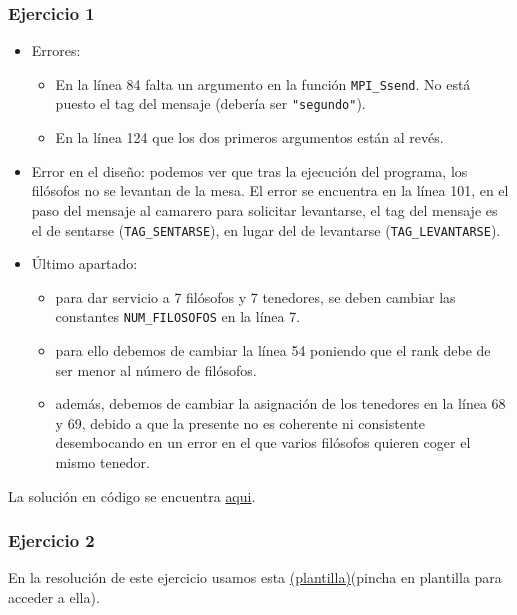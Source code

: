 \documentclass[a4paper,12pt]{article}
\begin{document}
\subsubsection*{Ejercicio 1}
\begin{itemize}
    \item Errores:
    \begin{itemize}
        \item En la línea 84 falta un argumento en la función \texttt{MPI\_Ssend}. No está puesto el tag del mensaje (debería ser \texttt{"segundo"}).
        \item En la línea 124 que los dos primeros argumentos están al revés.
    \end{itemize}
    \item Error en el diseño: podemos ver que tras la ejecución del programa, los filósofos no se levantan de la mesa. El error se encuentra en la línea 101, en el paso del mensaje al camarero para solicitar levantarse, el tag del mensaje es el de sentarse (\texttt{TAG\_SENTARSE}), en lugar del de levantarse (\texttt{TAG\_LEVANTARSE}).
    \item Último apartado: 
    \begin{itemize}
        \item para dar servicio a 7 filósofos y 7 tenedores, se deben cambiar las constantes \texttt{NUM\_FILOSOFOS} en la línea 7.
        \item para ello debemos de cambiar la línea 54 poniendo que el rank debe de ser menor al número de filósofos.
        \item además, debemos de cambiar la asignación de los tenedores en la línea 68 y 69, debido a que la presente no es coherente ni consistente desembocando en un error en el que varios filósofos quieren coger el mismo tenedor.
    \end{itemize}
\end{itemize}

La solución en código se encuentra \href{https://github.com/ElblogdeIsmael/ElblogdeIsmael.github.io/blob/main/Asignaturas/Tercer%20A%C3%B1o/SCD/Examenes/SegundoParcial/ETSIIT/code/ejercicio.cpp}{aqui}.

\subsubsection*{Ejercicio 2}

En la resolución de este ejercicio usamos esta \href{https://github.com/ElblogdeIsmael/ElblogdeIsmael.github.io/blob/main/Asignaturas/Tercer%20A%C3%B1o/SCD/Examenes/SegundoParcial/ETSIIT/code/prodcons2-muPlantilla.cpp}{(plantilla)}(pincha en plantilla para acceder a ella).
\end{document}
